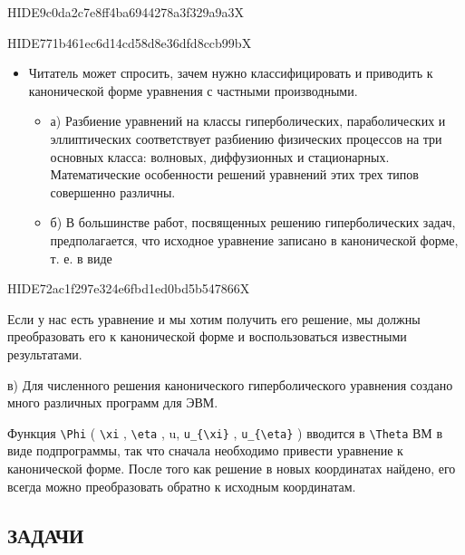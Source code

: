 \documentclass[
  ukrainian,
]{article}
\providecommand{\tightlist}{%
  \setlength{\itemsep}{0pt}\setlength{\parskip}{0pt}}
\begin{document}
HIDE9c0da2c7e8ff4ba6944278a3f329a9a3X

HIDE771b461ec6d14cd58d8e36dfd8ccb99bX

\begin{itemize}
\tightlist
\item
  Читатель может спросить, зачем нужно классифицировать и приводить к
  канонической форме уравнения с частными производными.

  \begin{itemize}
  \tightlist
  \item
    а) Разбиение уравнений на классы гиперболических, параболических и
    эллиптических соответствует разбиению физических процессов на три
    основных класса: волновых, диффузионных и стационарных.
    Математические особенности решений уравнений этих трех типов
    совершенно различны.
  \item
    б) В большинстве работ, посвященных решению гиперболических задач,
    предполагается, что исходное уравнение записано в канонической
    форме, т. е. в виде
  \end{itemize}
\end{itemize}

HIDE72ac1f297e324e6fbd1ed0bd5b547866X

Если у нас есть уравнение и мы хотим получить его решение, мы должны
преобразовать его к канонической форме и воспользоваться известными
результатами.

в) Для численного решения канонического гиперболического уравнения
создано много различных программ для ЭВМ.

Функция \texttt{\textbackslash{}Phi} ( \texttt{\textbackslash{}xi} ,
\texttt{\textbackslash{}eta} , u, \texttt{u\_\{\textbackslash{}xi\}} ,
\texttt{u\_\{\textbackslash{}eta\}} ) вводится в
\texttt{\textbackslash{}Theta} ВМ в виде подпрограммы, так что сначала
необходимо привести уравнение к канонической форме. После того как
решение в новых координатах найдено, его всегда можно преобразовать
обратно к исходным координатам.

\subsection{ЗАДАЧИ}\label{ux437ux430ux434ux430ux447ux438}
\end{document}
